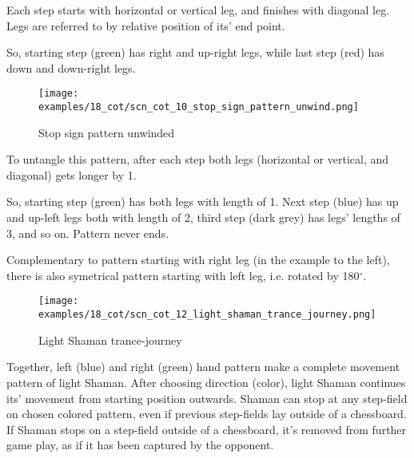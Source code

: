 Each step starts with horizontal or vertical leg, and finishes with diagonal
leg. Legs are referred to by relative position of its' end point.

So, starting step (green) has right and up-right legs, while last step (red)
has down and down-right legs.

\clearpage %

\noindent
\begin{wrapfigure}{l}{0.4\textwidth} %
\centering
\texttt{[image: examples/18\_cot/scn\_cot\_10\_stop\_sign\_pattern\_unwind.png]}
\caption{Stop sign pattern unwinded}
\label{fig:scn_cot_10_stop_sign_pattern_unwind}
\end{wrapfigure}
To untangle this pattern, after each step both legs (horizontal or vertical,
and diagonal) gets longer by 1.

So, starting step (green) has both legs with length of 1. Next step (blue)
has up and up-left legs both with length of 2, third step (dark grey) has
legs' lengths of 3, and so on. Pattern never ends.

Complementary to pattern starting with right leg (in the example to the
left), there is also symetrical pattern starting with left leg, i.e.
rotated by 180$^{\circ}$. %

\clearpage %

\noindent
\begin{figure}[!h]
\texttt{[image: examples/18\_cot/scn\_cot\_12\_light\_shaman\_trance\_journey.png]}
\caption{Light Shaman trance-journey}
\label{fig:scn_cot_12_light_shaman_trance_journey}
\end{figure}

Together, left (blue) and right (green) hand pattern make a complete movement
pattern of light Shaman. After choosing direction (color), light Shaman
continues its' movement from starting position outwards. Shaman can stop at
any step-field on chosen colored pattern, even if previous step-fields lay
outside of a chessboard. If Shaman stops on a step-field outside of a
chessboard, it's removed from further game play, as if it has been captured
by the opponent.

\clearpage %

